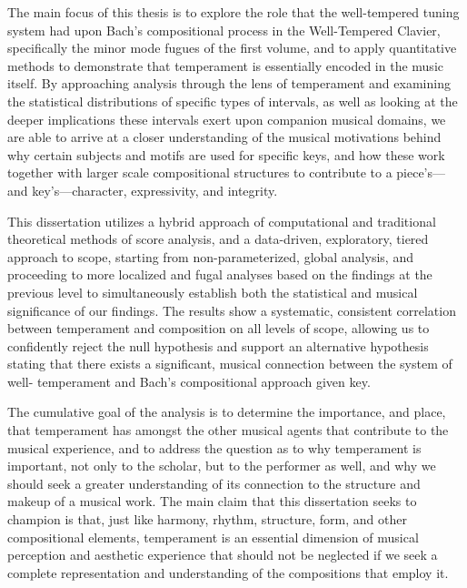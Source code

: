     
    
    
    

    
    The main focus of this thesis is to explore the role that the
well-tempered tuning system had upon Bach's compositional process in the
Well-Tempered Clavier, specifically the minor mode fugues of the first
volume, and to apply quantitative methods to demonstrate that
temperament is essentially encoded in the music itself. By approaching
analysis through the lens of temperament and examining the statistical
distributions of specific types of intervals, as well as looking at the
deeper implications these intervals exert upon companion musical
domains, we are able to arrive at a closer understanding of the musical
motivations behind why certain subjects and motifs are used for specific
keys, and how these work together with larger scale compositional
structures to contribute to a piece's---and key's---character,
expressivity, and integrity.

This dissertation utilizes a hybrid approach of computational and
traditional theoretical methods of score analysis, and a data-driven,
exploratory, tiered approach to scope, starting from non-parameterized,
global analysis, and proceeding to more localized and fugal analyses
based on the findings at the previous level to simultaneously establish
both the statistical and musical significance of our findings. The
results show a systematic, consistent correlation between temperament
and composition on all levels of scope, allowing us to confidently
reject the null hypothesis and support an alternative hypothesis stating
that there exists a significant, musical connection between the system
of well- temperament and Bach's compositional approach given key.

The cumulative goal of the analysis is to determine the importance, and
place, that temperament has amongst the other musical agents that
contribute to the musical experience, and to address the question as to
why temperament is important, not only to the scholar, but to the
performer as well, and why we should seek a greater understanding of its
connection to the structure and makeup of a musical work. The main claim
that this dissertation seeks to champion is that, just like harmony,
rhythm, structure, form, and other compositional elements, temperament
is an essential dimension of musical perception and aesthetic experience
that should not be neglected if we seek a complete representation and
understanding of the compositions that employ it.


    
    
    
